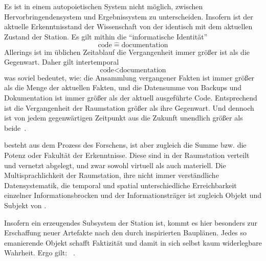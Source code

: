 \begin{newstuff}
    Es ist in einem autopoietischen System nicht möglich, zwischen Hervorbringendensystem und Ergebnissystem zu unterscheiden. Insofern ist der aktuelle Erkenntnisstand der Wissenschaft von der  identisch mit dem aktuellen Zustand der Station. Es gilt mithin die "`informatische Identität"'
    \begin{equation}
        \text{code}\;\widehat{=}\;\text{documentation}
    \end{equation}
    Allerings ist im üblichen Zeitablauf die Vergangenheit immer größer ist als die Gegenwart. Daher gilt intertemporal
    \begin{equation}
        \text{code} < \text{documentation}
    \end{equation}
    was soviel bedeutet, wie: die Ansammlung vergangener Fakten ist immer größer als die Menge der aktuellen Fakten, und die Datensumme von Backups und Dokumentation ist immer größer als der aktuell ausgeführte Code. Entsprechend ist die Vergangenheit der Raumstation größer als ihre Gegenwart. Und dennoch ist von jedem gegenwärtigen Zeitpunkt aus die Zukunft unendlich größer als beide~\cite{encyclopaedia}.


     besteht aus dem Prozess des Forschens, ist aber zugleich die Summe bzw. die Potenz oder Fakultät der Erkenntnisse. Diese sind in der Raumstation verteilt und vernetzt abgelegt, und zwar sowohl virtuell als auch materiell. 
    Die Multisprachlichkeit der Raumstation, ihre nicht immer verständliche Datensystematik, die temporal und spatial unterschiedliche Erreichbarkeit einzelner Informationsbrocken und der  Informationsträger ist zugleich Objekt und Subjekt von .

    Insofern  ein erzeugendes Subsystem der Station ist, kommt es hier besonders zur Erschaffung neuer Artefakte nach den durch  inspirierten Bauplänen. Jedes so emanierende Objekt schafft Faktizität und damit in sich selbst kaum widerlegbare Wahrheit. Ergo gilt: ~\cite[S.~47]{cbasebook}.
\end{newstuff}